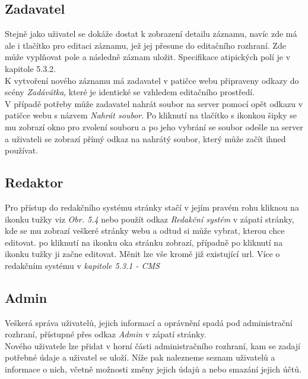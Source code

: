 \subsection{Zadavatel}
Stejně jako uživatel se dokáže dostat k zobrazení detailu záznamu, navíc zde má
ale i tlačítko pro editaci záznamu, jež jej přesune do editačního rozhraní.
Zde může vyplňovat pole a následně záznam uložit. Specifikace atipických polí
je v kapitole 5.3.2.\\
K vytvoření nového záznamu má zadavatel v patičce webu připraveny odkazy do
scény \textit{Zadávátka}, které je identické se vzhledem editačního prostředí.\\
V případě potřeby může zadavatel nahrát soubor na server pomocí opět odkazu v
patičce webu s názvem \textit{Nahrát soubor}. Po kliknutí na tlačítko
s ikonkou šipky se mu zobrazí okno pro zvolení souboru a po jeho vybrání se
soubor odešle na server a uživateli se zobrazí přímý odkaz na nahrátý soubor, který
může začít ihned používat.

\subsection{Redaktor}
Pro přístup do redakčního systému stránky stačí v jejím pravém rohu kliknou 
na ikonku tužky viz \textit{Obr. 5.4} nebo použít odkaz \textit{Redakční systém}
v zápatí stránky, kde se mu zobrazí veškeré stránky webu a odtud si může vybrat,
kterou chce editovat. po kliknutí na ikonku oka stránku zobrazí, případně po
kliknutí na ikonku tužky ji začne editovat. Měnit lze vše kromě již existující
url. Více o redakčním systému v \textit{kapitole 5.3.1 - CMS}


\subsection{Admin}
Veškerá správa uživatelů, jejich informací a oprávnění spadá pod administrační rozhraní,
přístupné přes odkaz \textit{Admin} v zápatí stránky.\\
Nového uživatele lze přidat v horní části administračního rozhraní, kam se
zadají potřebné údaje a uživatel se uloží. Níže pak nalezneme seznam uživatelů a
informace o nich, včetně možnosti změny jejich údajů a nebo smazání jejich účtů.
